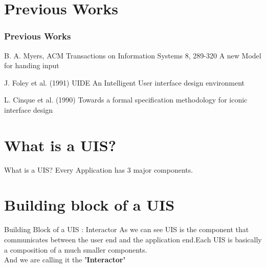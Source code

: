 \documentclass{beamer}
\begin{document}
\section{Previous Works}
\begin{frame}
\frametitle{Previous Works}
\begin{block}{B. A. Myers, ACM Transactions on Information Systems 8, 289-320}
A new Model for handing input
\end{block}

\begin{block}{J. Foley et al. (1991) UIDE}
An Intelligent User interface design environment
\end{block}

\begin{block}{L. Cinque et al. (1990)}
Towards a formal specification methodology for iconic interface design
\end{block}
\end{frame}



\section{What is a UIS?}
\begin{frame}{What is a UIS?}
   	Every Application has 3 major components.
   	\begin{figure}[h]
    	\centering
    \end{figure}
\end{frame}

\section{Building block of a UIS}
\begin{frame}{Building Block of a UIS : Interactor}
	As we can see UIS is the component that communicates between the user end and the application end.Each UIS is basically a composition of a much smaller components.\\
	 And we are calling it the \textbf{'Interactor'}   
\end{frame}
\end{document}
